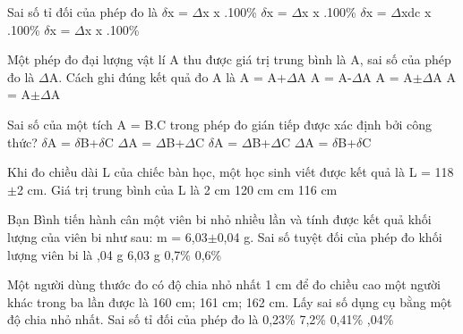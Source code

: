 \begin{ex} Sai số tỉ đối của phép đo là
\choice
{$\delta$x = $\Delta$x x .100\%}
{\True $\delta$x = $\Delta$x x .100\%}
{$\delta$x = $\Delta$xdc x .100\%}
{$\delta$x = $\Delta$x x .100\%}
\loigiai{}
\end{ex}

\begin{ex} Một phép đo đại lượng vật lí A thu được giá trị trung bình là A, sai số của
phép đo là $\Delta$A. Cách ghi đúng kết quả đo A là
\choice
{A = A+$\Delta$A}
{A = A-$\Delta$A}
{A = A$\pm$$\Delta$A}
{\True A = A$\pm$$\Delta$A}
\loigiai{}
\end{ex}

\begin{ex} Sai số của một tích A = B.C trong phép đo gián tiếp được xác định bởi công
thức?
\choice
{\True $\delta$A = $\delta$B+$\delta$C}
{$\Delta$A = $\Delta$B+$\Delta$C}
{$\delta$A = $\Delta$B+$\Delta$C}
{$\Delta$A = $\delta$B+$\delta$C}
\loigiai{}
\end{ex}

\begin{ex} Khi đo chiều dài L của chiếc bàn học, một học sinh viết được kết quả là
L = 118$\pm$2 cm. Giá trị trung bình của L là
\choice
{2 cm}
{120 cm}
{ cm}
{116 cm}
\loigiai{}
\end{ex}

\begin{ex} Bạn Bình tiến hành cân một viên bi nhỏ nhiều lần và tính được kết quả khối
lượng của viên bi như sau: m = 6,03$\pm$0,04 g. Sai số tuyệt đối của phép đo khối lượng viên
bi là
\choice
{,04 g}
{6,03 g}
{0,7\%}
{0,6\%}
\loigiai{}
\end{ex}

\begin{ex} Một người dùng thước đo có độ chia nhỏ nhất 1 cm để đo chiều cao một người
khác trong ba lần được là 160 cm; 161 cm; 162 cm. Lấy sai số dụng cụ bằng một độ chia
nhỏ nhất. Sai số tỉ đối của phép đo là
\choice
{0,23\%}
{7,2\%}
{0,41\%}
{,04\%}
\end{ex}

